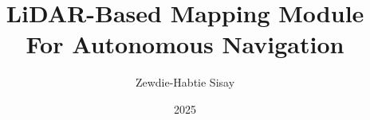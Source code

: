 \documentclass[
	noindent, %
	nohyp, %
]{elteikthesis}[2024/04/26]
\title{LiDAR-Based Mapping Module\\For Autonomous Navigation } %
\date{2025} %
\author{Zewdie-Habtie Sisay}
\affiliation{Professor} %
\begin{document}



\newcommand{\reffig}[1]{(Fig. \ref{fig:#1})}
\newcommand{\refch}[1]{(Chapter \ref{ch:#1})}



\maketitle


\tableofcontents
\cleardoublepage


\cleardoublepage


\cleardoublepage


\cleardoublepage


\cleardoublepage


\cleardoublepage

% 

% 

% 

% 


% 


{}
\printbibliography[title=\biblabel]
\cleardoublepage
\end{document}
